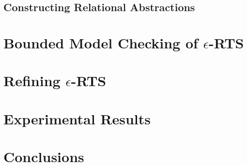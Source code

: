 \documentclass[9pt,sigconf]{acmart}
\begin{document}
\subsection{Constructing Relational Abstractions}


\section{Bounded Model Checking of $\epsilon$-RTS}
\label{sec:bmc}


\section{Refining $\epsilon$-RTS}
\label{sec:rel-mod}







\section{Experimental Results}
\label{sec:res}



\section{Conclusions}
\label{sec:concl}





\clearpage
\appendix

\end{document}
